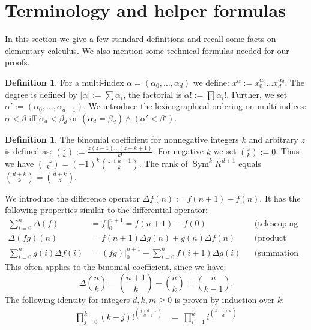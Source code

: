 \documentclass{amsart}
\DeclareMathOperator{\Sym}{Sym}
\newcommand{\coloneqq}{:=}
\theoremstyle{plain}
\theoremstyle{definition}
\newtheorem{definition}[theorem]{Definition}
\theoremstyle{remark}
\begin{document}
\section{Terminology and helper formulas} \label{boring}
In this section 
we give a few standard definitions and recall some facts on elementary calculus. We also mention some technical formulas needed for our proofs.
\begin{definition}\label{multiindex}
For a multi-index $\alpha=(\alpha_0,\ldots,\alpha_d)$ we define: $x^\alpha \coloneqq x_0^{\alpha_0}\ldots x_d^{\alpha_d}$. The degree is defined by $|\alpha |\coloneqq\sum\alpha_i$, the factorial is $\alpha! \coloneqq \prod \alpha_i!$. Further, we set
$\alpha'\coloneqq(\alpha_0,\ldots,\alpha_{d-1})$. We introduce the lexicographical ordering on multi-indices: $\alpha < \beta$ iff $\alpha_d < \beta_d$ or $(\alpha_d=\beta_d) \wedge (\alpha'<\beta')$.
\end{definition}
\begin{definition}
The binomial coefficient for nonnegative integers $k$ and arbitrary $z$ is defined as:
$\binom{z}{k} \coloneqq \frac{z(z-1)\ldots(z-k+1)}{k!}$. For negative $k$ we set $\binom{z}{k}\coloneqq 0$. Thus we have $\binom{-z}{k}=(-1)^k\binom{z+k-1}{k}$. 
The rank of $\Sym^k K^{d+1}$ equals $\binom{d+k}{k}=\binom{d+k}{d}$.
\end{definition}
We introduce the difference operator $\Delta f(n) \coloneqq f(n+1)-f(n)$. It has the following properties similar to the differential operator:
\begin{align}
 \sum_{i=0}^n \Delta(f) & = f\,\Big|_0^{n+1}= f(n+1)-f(0) && \text{(telescoping sum)} \\
 \Delta (fg)(n) &= f(n+1) \Delta g(n) + g(n)\Delta f(n) &&\text{(product rule)} \\
\label{sumbyparts}  \sum_{i=0}^n g(i)\Delta f(i) & = (fg)\Big|_0^{n+1} - \sum_{i=0}^n f(i+1)\Delta g(i) && \text{(summation by parts)}
\end{align}
This often applies to the binomial coefficient, since we have: 
\begin{equation} \label{binomdiff}
\textstyle \Delta \binom{n}{k}=\binom{n+1}{k}-\binom{n}{k} = \binom{n}{k-1}.
\end{equation}
The following identity for integers $d,k,m\geq 0$ is proven by induction over $k$:
\begin{align} \label{facprod1}
\prod_{j=0}^k (k-j)!^{\binom{j+d-1}{d-1}} &= \ \prod_{i=1}^k i^{\binom{k-i+d}{d}}
\end{align}
\end{document}
